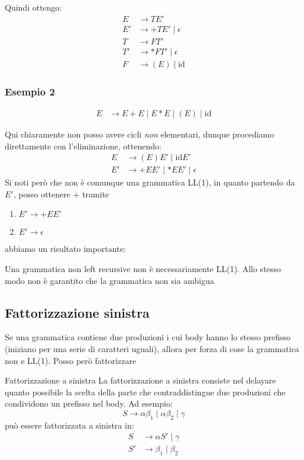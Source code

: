Quindi ottengo:
\begin{align*}
	E  & \rightarrow TE'                \\
	E' & \rightarrow +TE' \mid \epsilon \\
	T  & \rightarrow FT'                \\
	T' & \rightarrow *FT' \mid \epsilon \\
	F  & \rightarrow (E) \mid \text{id}
\end{align*}

\subsubsection{Esempio 2}
\begin{align*}
	E & \rightarrow E + E \mid E * E \mid (E) \mid \text{id}
\end{align*}

Qui chiaramente non posso avere cicli \textit{non} elementari, dunque procediamo direttamente con l'eliminazione, ottenendo:
\begin{align*}
	E  & \rightarrow (E)E' \mid \text{id}E'       \\
	E' & \rightarrow +EE' \mid *EE' \mid \epsilon
\end{align*}
Si noti però che non è comunque una grammatica LL(1), in quanto partendo da $ E' $, posso ottenere $ + $ tramite
\begin{enumerate}
	\item $ E' \rightarrow +E E' $
	\item $ E' \rightarrow \epsilon  $
\end{enumerate}

abbiamo un risultato importante:
\begin{center}
	Una grammatica non left recursive non è necessariamente LL(1). Allo stesso modo non è garantito che la grammatica non sia ambigua
\end{center}
\subsection{Fattorizzazione sinistra}
Se una grammatica contiene due produzioni i cui body hanno lo stesso prefisso (iniziano per una serie di caratteri uguali), allora per forza di cose la grammatica non e LL(1). Posso però fattorizzare
\begin{definizione}{Fattorizzazione a sinistra}
	La fattorizzazione a sinistra consiste nel delayare quanto possibile la scelta della parte che contraddistingue due produzioni che condividono un prefisso nel body. Ad esempio:
	\[
		S \rightarrow \alpha \beta_1 \mid \alpha \beta_2 \mid \gamma
	\]
	può essere fattorizzata a sinistra in:
	\begin{align*}
		S  & \rightarrow \alpha S' \mid \gamma \\
		S' & \rightarrow \beta_1 \mid \beta_2
	\end{align*}
\end{definizione}
